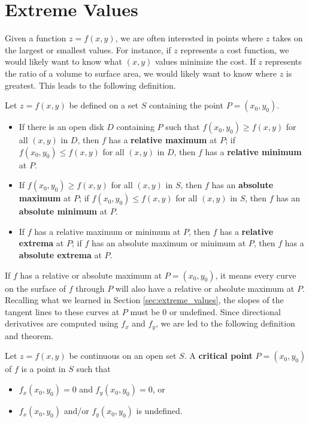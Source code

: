 \section{Extreme Values}\label{sec:multi_extreme_values}

Given a function $z=f(x,y)$, we are often interested in points where $z$ takes on the largest or smallest values. For instance, if $z$ represents a cost function, we would likely want to know what $(x,y)$ values minimize the cost. If $z$ represents the ratio of a volume to surface area, we would likely want to know where $z$ is greatest. This leads to the following definition.

{Let $z=f(x,y)$ be defined on a set $S$ containing the point $P=(x_0,y_0)$.
\begin{itemize}
	\item If there is an open disk $D$ containing $P$ such that $f(x_0,y_0) \geq f(x,y)$ for all $(x,y)$ in $D$, then $f$ has a \textbf{relative maximum} at $P$; if $f(x_0,y_0) \leq f(x,y)$ for all $(x,y)$ in $D$, then $f$ has a \textbf{relative minimum} at $P$.
	
	\item	If $f(x_0,y_0)\geq f(x,y)$ for all $(x,y)$ in $S$, then $f$ has an \textbf{absolute maximum} at $P$; if $f(x_0,y_0)\leq f(x,y)$ for all $(x,y)$ in $S$, then $f$ has an \textbf{absolute minimum} at $P$.
	
	\item		If $f$ has a relative maximum or minimum at $P$, then $f$ has a \textbf{relative extrema} at $P$; if $f$ has an absolute maximum or minimum at $P$, then $f$ has a \textbf{absolute extrema} at $P$.
\end{itemize}
}

If $f$ has a relative or absolute maximum at $P=(x_0,y_0)$, it means every curve on the surface of $f$ through $P$ will also have a relative or absolute maximum at $P$. Recalling what we learned in Section \ref{sec:extreme_values}, the slopes of the tangent lines to these curves at $P$ must be 0 or undefined. Since directional derivatives are computed using $f_x$ and $f_y$, we are led to the following definition and theorem.

{Let $z = f(x,y)$ be continuous on an open set $S$. A \textbf{critical point} $P=(x_0,y_0)$ of $f$ is a point in $S$ such that 
\begin{itemize}
	\item $f_x(x_0,y_0) = 0$ and $f_y(x_0,y_0) = 0$, or
	\item	$f_x(x_0,y_0)$ and/or $f_y(x_0,y_0)$ is undefined.
\end{itemize}
}

